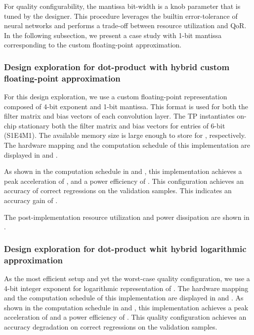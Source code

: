 For quality configurability, the mantissa bit-width is a knob parameter that is tuned by the designer. This procedure leverages the builtin error-tolerance of neural networks and performs a trade-off between resource utilization and QoR. In the following subsection, we present a case study with 1-bit mantissa corresponding to the custom floating-point approximation.

\subsubsection{Design exploration for dot-product with hybrid custom floating-point approximation}
For this design exploration, we use a custom floating-point representation composed of 4-bit exponent and 1-bit mantissa. This format is used for both the filter matrix and bias vectors of each convolution layer. The TP instantiates on-chip stationary both the filter matrix and bias vectors for  entries of 6-bit (S1E4M1). The available memory size is large enough to store  for , respectively. The hardware mapping and the computation schedule of this implementation are displayed in  and .

As shown in the computation schedule in  and , this implementation achieves a peak acceleration of , and a power efficiency of . This configuration achieves an accuracy of  correct regressions on the  validation samples. This indicates an accuracy gain of .

The post-implementation resource utilization and power dissipation are shown in .


\subsubsection{Design exploration for dot-product whit hybrid logarithmic approximation}
As the most efficient setup and yet the worst-case quality configuration, we use a 4-bit integer exponent for logarithmic representation of . The hardware mapping and the computation schedule of this implementation are displayed in  and . As shown in the computation schedule in  and , this implementation achieves a peak acceleration of  and a power efficiency of . This quality configuration achieves an accuracy degradation  on correct regressions on the  validation samples.

